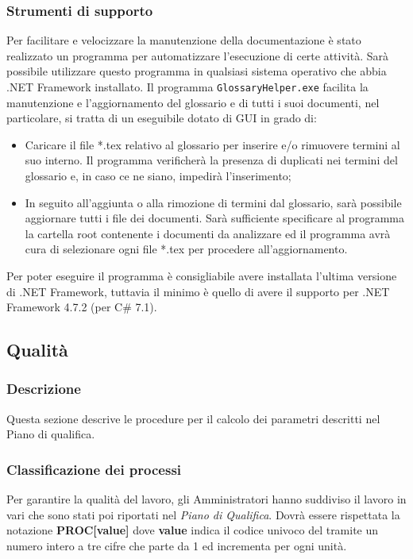 \subsubsection{Strumenti di supporto}
Per facilitare e velocizzare la manutenzione della documentazione è stato realizzato un programma per automatizzare l’esecuzione di certe attività. Sarà possibile utilizzare questo programma in qualsiasi sistema operativo che abbia .NET Framework installato. Il programma \texttt{GlossaryHelper.exe} facilita la manutenzione e l’aggiornamento del glossario e di tutti i suoi documenti, nel particolare, si tratta di un eseguibile dotato di GUI in grado di:
\begin{itemize}
    \item Caricare il file *.tex relativo al glossario per inserire e/o rimuovere termini al suo interno. Il programma verificherà la presenza di duplicati nei termini del glossario e, in caso ce ne siano, impedirà l’inserimento;
    \item In seguito all’aggiunta o alla rimozione di termini dal glossario, sarà possibile aggiornare tutti i file dei documenti. Sarà sufficiente specificare al programma la cartella root contenente i documenti da analizzare ed il programma avrà cura di selezionare ogni file *.tex per procedere all’aggiornamento.
\end{itemize}
Per poter eseguire il programma è consigliabile avere installata l’ultima versione di .NET Framework, tuttavia il  minimo è quello di avere il supporto per .NET Framework 4.7.2 (per C\# 7.1).
\subsection{Qualità}
\label{sec:qualita}
\subsubsection{Descrizione}
Questa sezione descrive le procedure per il calcolo dei parametri descritti nel Piano di qualifica.
\subsubsection{Classificazione dei processi}
Per garantire la qualità del lavoro, gli Amministratori hanno suddiviso il lavoro in vari  che sono stati poi riportati nel \emph{Piano di Qualifica}. Dovrà essere rispettata la notazione \textbf{PROC[value]}  dove \textbf{value} indica il codice univoco del  tramite un numero intero a tre cifre che parte da 1 ed incrementa per ogni unità.

